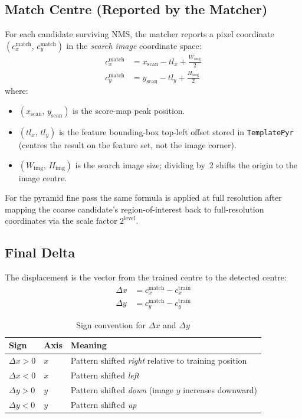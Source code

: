 \documentclass[12pt,a4paper]{article}
\begin{document}
\subsection{Match Centre (Reported by the Matcher)}
For each candidate surviving NMS, the matcher reports a pixel coordinate
$(c_x^\text{match},\, c_y^\text{match})$ in the \emph{search image} coordinate
space:
\begin{align}
  c_x^\text{match} &= x_\text{scan} - tl_x + \tfrac{W_\text{img}}{2} \\
  c_y^\text{match} &= y_\text{scan} - tl_y + \tfrac{H_\text{img}}{2}
\end{align}
where:
\begin{itemize}
  \item $(x_\text{scan},\, y_\text{scan})$ is the score-map peak position.
  \item $(tl_x,\, tl_y)$ is the feature bounding-box top-left offset stored in
        \texttt{TemplatePyr} (centres the result on the feature set, not the
        image corner).
  \item $(W_\text{img},\, H_\text{img})$ is the search image size; dividing by~2
        shifts the origin to the image centre.
\end{itemize}
For the pyramid fine pass the same formula is applied at full resolution after
mapping the coarse candidate's region-of-interest back to full-resolution
coordinates via the scale factor $2^{\text{level}}$.

\subsection{Final Delta}
The displacement is the vector from the trained centre to the detected centre:
\begin{align}
  \Delta x &= c_x^\text{match} - c_x^\text{train} \\
  \Delta y &= c_y^\text{match} - c_y^\text{train}
\end{align}

\begin{table}[H]
  \centering
  \caption{Sign convention for $\Delta x$ and $\Delta y$}
  \label{tab:delta}
  \begin{tabular}{lll}
    \toprule
    \textbf{Sign} & \textbf{Axis} & \textbf{Meaning}           \\
    \midrule
    $\Delta x > 0$ & $x$ & Pattern shifted \emph{right} relative to training position \\
    $\Delta x < 0$ & $x$ & Pattern shifted \emph{left}                                \\
    $\Delta y > 0$ & $y$ & Pattern shifted \emph{down} (image $y$ increases downward) \\
    $\Delta y < 0$ & $y$ & Pattern shifted \emph{up}                                   \\
    \bottomrule
  \end{tabular}
\end{table}
\end{document}

